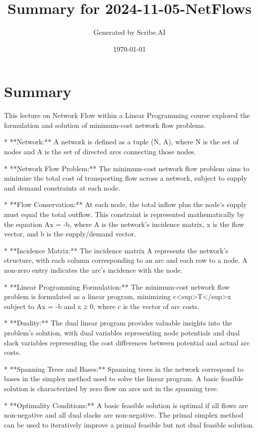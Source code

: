 \documentclass{article}%
\title{Summary for 2024{-}11{-}05{-}NetFlows}%
\author{Generated by Scribe.AI}%
\date{\today}%
\begin{document}
%
\normalsize%
\maketitle%
\section{Summary}%
\label{sec:Summary}%
This lecture on Network Flow within a Linear Programming course explored the formulation and solution of minimum-cost network flow problems.

* **Network:** A network is defined as a tuple (N, A), where N is the set of nodes and A is the set of directed arcs connecting those nodes.

* **Network Flow Problem:**  The minimum-cost network flow problem aims to minimize the total cost of transporting flow across a network, subject to supply and demand constraints at each node.

* **Flow Conservation:** At each node, the total inflow plus the node's supply must equal the total outflow.  This constraint is represented mathematically by the equation Ax = -b, where A is the network's incidence matrix, x is the flow vector, and b is the supply/demand vector.

* **Incidence Matrix:** The incidence matrix A represents the network's structure, with each column corresponding to an arc and each row to a node.  A non-zero entry indicates the arc's incidence with the node.

* **Linear Programming Formulation:** The minimum-cost network flow problem is formulated as a linear program, minimizing c<sup>T</sup>x subject to Ax = -b and x ≥ 0, where c is the vector of arc costs.

* **Duality:** The dual linear program provides valuable insights into the problem's solution, with dual variables representing node potentials and dual slack variables representing the cost differences between potential and actual arc costs.

* **Spanning Trees and Bases:**  Spanning trees in the network correspond to bases in the simplex method used to solve the linear program.  A basic feasible solution is characterized by zero flow on arcs not in the spanning tree.

* **Optimality Conditions:** A basic feasible solution is optimal if all flows are non-negative and all dual slacks are non-negative.  The primal simplex method can be used to iteratively improve a primal feasible but not dual feasible solution.

%
\end{document}
